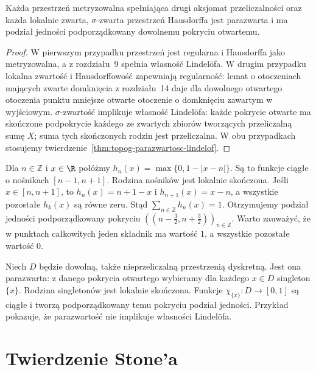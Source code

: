 \begin{wniosek}
\label{cor:topog-parazwartosc-klasy}
Każda przestrzeń metryzowalna
spełniająca drugi aksjomat przeliczalności
oraz każda lokalnie zwarta, $\sigma$-zwarta
przestrzeń Hausdorffa jest parazwarta
i ma podział jedności podporządkowany
dowolnemu pokryciu otwartemu.
\end{wniosek}
\begin{proof}
W pierwszym przypadku przestrzeń jest
regularna i Hausdorffa jako metryzowalna,
a z rozdziału~9 spełnia własność Lindelöfa.
W drugim przypadku lokalna zwartość
i Hausdorffowość zapewniają regularność:
lemat o otoczeniach mających zwarte
domknięcia z rozdziału~14 daje
dla dowolnego otwartego otoczenia
punktu mniejsze otwarte otoczenie
o domknięciu zawartym w wyjściowym.
$\sigma$-zwartość implikuje własność
Lindelöfa: każde pokrycie otwarte
ma skończone podpokrycie każdego
ze zwartych zbiorów tworzących
przeliczalną sumę $X$; suma tych
skończonych rodzin jest przeliczalna.
W obu przypadkach stosujemy
twierdzenie~\ref{thm:topog-parazwartosc-lindelof}.
\end{proof}

\begin{przyklad}
\label{ex:topog-parazwartosc-prosta}
Dla $n\in\mathbb Z$ i $x\in\R$ połóżmy
$h_n(x)=\max\{0,1-|x-n|\}$.
Są to funkcje ciągłe o nośnikach
$[n-1,n+1]$. Rodzina nośników
jest lokalnie skończona.
Jeśli $x\in[n,n+1]$, to
$h_n(x)=n+1-x$ i
$h_{n+1}(x)=x-n$,
a wszystkie pozostałe $h_k(x)$
są równe zeru. Stąd
$\sum_{n\in\mathbb Z}h_n(x)=1$.
Otrzymujemy podział jedności
podporządkowany pokryciu
$((n-\tfrac32,n+\tfrac32))_{n\in\mathbb Z}$.
Warto zauważyć, że w punktach całkowitych
jeden składnik ma wartość $1$,
a wszystkie pozostałe wartość $0$.
\end{przyklad}

\begin{przyklad}
\label{ex:topog-parazwartosc-dyskretna}
Niech $D$ będzie dowolną, także
nieprzeliczalną przestrzenią dyskretną.
Jest ona parazwarta: z danego
pokrycia otwartego wybieramy dla każdego
$x\in D$ singleton $\{x\}$.
Rodzina singletonów jest lokalnie skończona.
Funkcje $\chi_{\{x\}}:D\to[0,1]$
są ciągłe i tworzą podporządkowany
temu pokryciu podział jedności.
Przykład pokazuje, że parazwartość
nie implikuje własności Lindelöfa.
\end{przyklad}

\section{Twierdzenie Stone'a}
\label{sec:topog-parazwartosc-stone}


